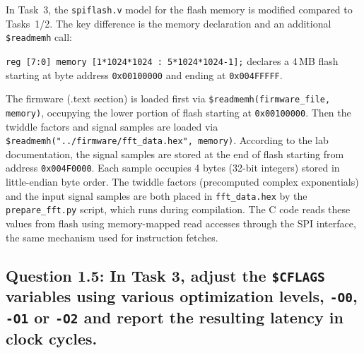 \documentclass{article}
\begin{document}
\begin{tcolorbox}[colback=white, colframe=black, width=\textwidth, title=Answer 1.4]

In Task~3, the \texttt{spiflash.v} model for the flash memory is modified compared to Tasks~1/2. The key difference is the memory declaration and an additional \texttt{\$readmemh} call:

\vspace{0.2cm}

\texttt{reg [7:0] memory [1*1024*1024 : 5*1024*1024-1];} declares a 4\,MB flash starting at byte address \texttt{0x00100000} and ending at \texttt{0x004FFFFF}.

\vspace{0.2cm}

The firmware (.text section) is loaded first via \texttt{\$readmemh(firmware\_file, memory)}, occupying the lower portion of flash starting at \texttt{0x00100000}. Then the twiddle factors and signal samples are loaded via \texttt{\$readmemh("../firmware/fft\_data.hex", memory)}. According to the lab documentation, the signal samples are stored at the end of flash starting from address \texttt{0x004F0000}. Each sample occupies 4 bytes (32-bit integers) stored in little-endian byte order. The twiddle factors (precomputed complex exponentials) and the input signal samples are both placed in \texttt{fft\_data.hex} by the \texttt{prepare\_fft.py} script, which runs during compilation. The C code reads these values from flash using memory-mapped read accesses through the SPI interface, the same mechanism used for instruction fetches.

\end{tcolorbox}

\subsection*{Question 1.5: In Task 3, adjust the \texttt{\$CFLAGS} variables using various optimization levels, \texttt{-O0}, \texttt{-O1} or \texttt{-O2} and report the resulting latency in clock cycles.}
\end{document}
